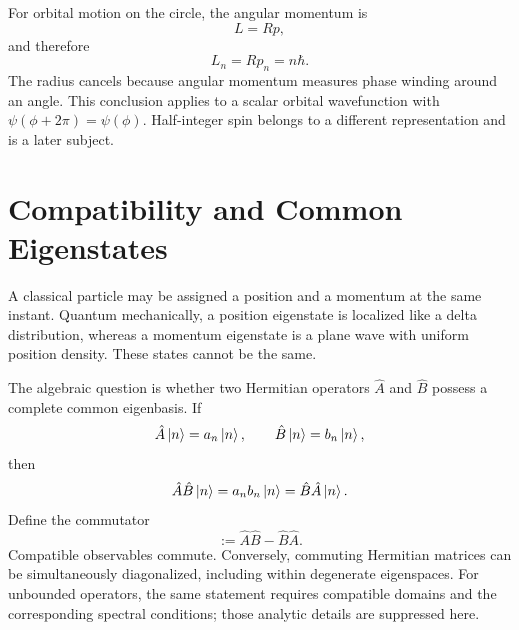 For orbital motion on the circle, the angular momentum is
\begin{equation}
  L=Rp,
\end{equation}
and therefore
\begin{equation}
  L_n=Rp_n=n\hbar.
  \label{eq:angular-momentum}
\end{equation}
The radius cancels because angular momentum measures phase winding around an
angle. This conclusion applies to a scalar orbital wavefunction with
\(\psi(\phi+2\pi)=\psi(\phi)\). Half-integer spin belongs to a different
representation and is a later subject.

\begin{classroomqa}
\end{classroomqa}

\begin{classroomqa}
\end{classroomqa}

\section{Compatibility and Common Eigenstates}

A classical particle may be assigned a position and a momentum at the same
instant. Quantum mechanically, a position eigenstate is localized like a
delta distribution, whereas a momentum eigenstate is a plane wave with
uniform position density. These states cannot be the same.

The algebraic question is whether two Hermitian operators \(\hat A\) and
\(\hat B\) possess a complete common eigenbasis. If
\begin{equation}
  \hat A\left\lvert n\right\rangle=a_n\left\lvert n\right\rangle,
  \qquad
  \hat B\left\lvert n\right\rangle=b_n\left\lvert n\right\rangle,
\end{equation}
then
\begin{equation}
  \hat A\hat B\left\lvert n\right\rangle=a_nb_n\left\lvert n\right\rangle
  =\hat B\hat A\left\lvert n\right\rangle.
\end{equation}
Define the commutator
\begin{equation}
  [\hat A,\hat B]:=\hat A\hat B-\hat B\hat A.
\end{equation}
Compatible observables commute. Conversely, commuting Hermitian matrices can
be simultaneously diagonalized, including within degenerate eigenspaces.
For unbounded operators, the same statement requires compatible domains and
the corresponding spectral conditions; those analytic details are
suppressed here.

